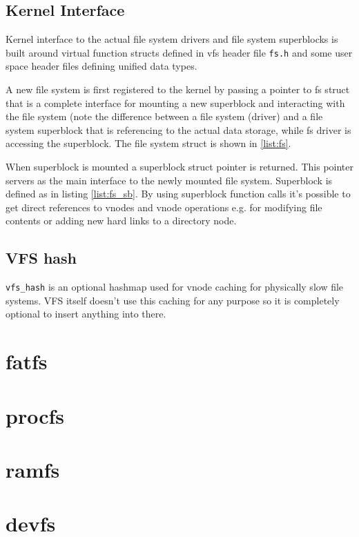 \section{Kernel Interface}

Kernel interface to the actual file system drivers and file system superblocks
is built around virtual function structs defined in \acs{vfs} header file
\verb+fs.h+ and some user space header files defining unified data types.

A new file system is first registered to the kernel by passing a pointer to
fs struct that is a complete interface for mounting a new superblock and
interacting with the file system (note the difference between a file system
(driver) and a file system superblock that is referencing to the actual data
storage, while fs driver is accessing the superblock. The file system struct
is shown in \ref{list:fs}.

When superblock is mounted a superblock struct pointer is returned. This pointer
servers as the main interface to the newly mounted file system. Superblock is
defined as in listing \ref{list:fs_sb}. By using superblock function calls it's
possible to get direct references to vnodes and \acs{vnode} operations e.g. for
modifying file contents or adding new hard links to a directory node.




\section{VFS hash}

\verb+vfs_hash+ is an optional hashmap used for vnode caching for physically
slow file systems. VFS itself doesn't use this caching for any purpose so
it is completely optional to insert anything into there.

\chapter{fatfs}


\chapter{procfs}


\chapter{ramfs}


\chapter{devfs}

